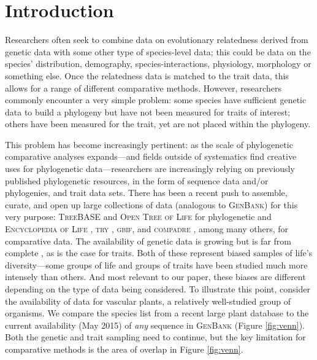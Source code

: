 \documentclass[a4paper,11pt]{article}
\begin{document}
\vfill

\newpage

\section{Introduction}
Researchers often seek to combine data on evolutionary relatedness derived from genetic data with some other type of species-level data; this could be data on the species' distribution, demography, species-interactions, physiology, morphology or something else. Once the relatedness data is matched to the trait data, this allows for a range of different comparative methods. However, researchers commonly encounter a very simple problem: some species have sufficient genetic data to build a phylogeny but have not been measured for traits of interest; others have been measured for the trait, yet are not placed within the phylogeny. 

This problem has become increasingly pertinent: as the scale of phylogenetic comparative analyses expands---and fields outside of systematics find creative uses for phylogenetic data---researchers are increasingly relying on previously published phylogenetic resources, in the form of sequence data and/or phylogenies, and trait data sets. There has been a recent push to assemble, curate, and open up large collections of data (analogous to \textsc{GenBank}) for this very purpose: \textsc{TreeBASE} \citep{treebase} and \textsc{Open Tree of Life} \citep{OpenTree} for phylogenetic and \textsc{Encyclopedia of Life} \citep{eol}, \textsc{try} \citep{try}, \textsc{gbif}, and \textsc{compadre} \citep{salguero2015}, among many others, for comparative data.  The availability of genetic data is growing but is far from complete \citep{hinchliff2014}, as is the case for traits. Both of these represent biased samples of life's diversity---some groups of life and groups of traits have been studied much more intensely than others.  And most relevant to our paper, these biases are different depending on the type of data being considered. To illustrate this point, consider the availability of data for vascular plants, a relatively well-studied group of organisms. We compare the species list from a recent large plant database \citep{Zanne} to the current availability (May 2015) of \emph{any} sequence in \textsc{GenBank} (Figure \ref{fig:venn}).  Both the genetic and trait sampling need to continue, but the key limitation for comparative methods is the area of overlap in Figure \ref{fig:venn}.  
\end{document}
